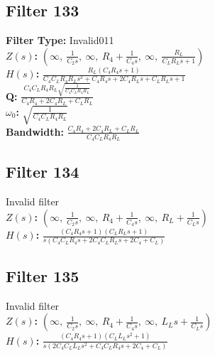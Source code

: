 \documentclass{article}
\begin{document}
\subsection*{Filter 133}
\textbf{Filter Type:} Invalid011 \\ 
\textbf{$Z(s)$:} $\left( \infty, \  \frac{1}{C_{2} s}, \  \infty, \  R_{4} + \frac{1}{C_{4} s}, \  \infty, \  \frac{R_{L}}{C_{L} R_{L} s + 1}\right)$ \\ 
\textbf{$H(s)$:} $\frac{R_{L} \left(C_{4} R_{4} s + 1\right)}{C_{4} C_{L} R_{4} R_{L} s^{2} + C_{4} R_{4} s + 2 C_{4} R_{L} s + C_{L} R_{L} s + 1}$ \\ 
\textbf{Q:} $\frac{C_{4} C_{L} R_{4} R_{L} \sqrt{\frac{1}{C_{4} C_{L} R_{4} R_{L}}}}{C_{4} R_{4} + 2 C_{4} R_{L} + C_{L} R_{L}}$ \\ 
\textbf{$\omega_0$:} $\sqrt{\frac{1}{C_{4} C_{L} R_{4} R_{L}}}$ \\ 
\textbf{Bandwidth:} $\frac{C_{4} R_{4} + 2 C_{4} R_{L} + C_{L} R_{L}}{C_{4} C_{L} R_{4} R_{L}}$ \\ 
\subsection*{Filter 134}
Invalid filter \\ 
\textbf{$Z(s)$:} $\left( \infty, \  \frac{1}{C_{2} s}, \  \infty, \  R_{4} + \frac{1}{C_{4} s}, \  \infty, \  R_{L} + \frac{1}{C_{L} s}\right)$ \\ 
\textbf{$H(s)$:} $\frac{\left(C_{4} R_{4} s + 1\right) \left(C_{L} R_{L} s + 1\right)}{s \left(C_{4} C_{L} R_{4} s + 2 C_{4} C_{L} R_{L} s + 2 C_{4} + C_{L}\right)}$ \\ 
\subsection*{Filter 135}
Invalid filter \\ 
\textbf{$Z(s)$:} $\left( \infty, \  \frac{1}{C_{2} s}, \  \infty, \  R_{4} + \frac{1}{C_{4} s}, \  \infty, \  L_{L} s + \frac{1}{C_{L} s}\right)$ \\ 
\textbf{$H(s)$:} $\frac{\left(C_{4} R_{4} s + 1\right) \left(C_{L} L_{L} s^{2} + 1\right)}{s \left(2 C_{4} C_{L} L_{L} s^{2} + C_{4} C_{L} R_{4} s + 2 C_{4} + C_{L}\right)}$ \\ 
\end{document}
